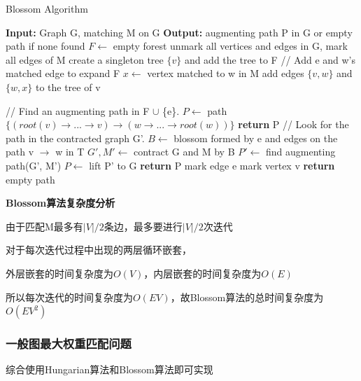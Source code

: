 \documentclass[UTF8]{ctexart}
\begin{document}
\begin{algorithm}
      \caption{Blossom Algorithm}
      \begin{algorithmic}[1]
            \State \textbf{Input:} Graph G, matching M on G
            \State \textbf{Output:} augmenting path P in G or empty path if none found
            \State
            \State $F \gets$ empty forest
            \State unmark all vertices and edges in G, mark all edges of M
            \State
            \State create a singleton tree $\{v\}$ and add the tree to F
            \EndFor
            \State
            \State // Add e and w's matched edge to expand F
            \State $x \gets$ vertex matched to w in M
            \State add edges $\{v,w\}$ and $\{w,x\}$ to the tree of v

            \Else
            \State // Find an augmenting path in F $\cup$ \{e\}.
            \State $P \gets$ path $\{(root(v) \to ... \to v) \to (w \to ... \to root(w))\}$
            \State \textbf{return} P
            \State // Look for the path in the contracted graph G'.
            \State $B \gets$ blossom formed by e and edges on the path v $\to$ w in T
            \State $G', M' \gets$ contract G and M by B
            \State $P' \gets$ find augmenting path(G', M')
            \State $P \gets$ lift P' to G
            \State \textbf{return} P
            \EndIf
            \EndIf
            \EndIf
            \State mark edge e
            \EndWhile
            \State mark vertex v
            \EndWhile
            \State \textbf{return} empty path
            \EndProcedure
      \end{algorithmic}
\end{algorithm}


\vspace{10.5cm}

\textbf{Blossom算法复杂度分析}

\vspace{0.1cm}

由于匹配M最多有$|V|/2$条边，最多要进行$|V|/2$次迭代

对于每次迭代过程中出现的两层循环嵌套，

外层嵌套的时间复杂度为$O(V)$，内层嵌套的时间复杂度为$O(E)$

所以每次迭代的时间复杂度为$O(EV)$，故Blossom算法的总时间复杂度为$O(EV^2)$


\subsubsection{一般图最大权重匹配问题}

综合使用Hungarian算法\cite{munkres1957algorithms}和Blossom算法\cite{edmonds1965paths}即可实现




\end{document}
